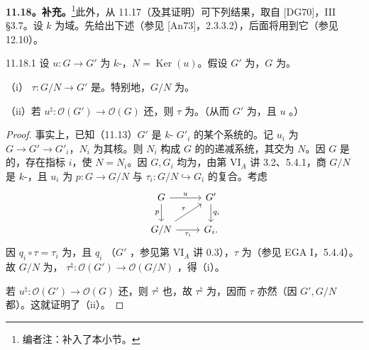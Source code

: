 \textbf{11.18。补充。}\footnote{编者注：补入了本小节。}此外，从 11.17（及其证明）可下列结果，取自 [DG70]，III §3.7。设 $k$ 为域。先给出下述（参见 [An73]，2.3.3.2），后面将用到它（参见 12.10）。

\begin{SGAresult}{}{11.18.1}
设 $u:G\to G'$ 为 $k$-，$N=\operatorname{Ker}(u)$。假设 $G'$ 为，$G$ 为。

（i） $\tau:G/N\to G'$ 是。特别地，$G/N$ 为。

（ii）若 $u^\natural:\mathcal O(G')\to\mathcal O(G)$ 还，则 $\tau$ 为。（从而 $G'$ 为，且 $u$ 。）
\end{SGAresult}
\begin{proof}
事实上，已知（11.13）$G'$ 是 $k$- $G'_i$ 的某个系统的。记 $u_i$ 为 $G\to G'\to G'_i$，$N_i$ 为其核。则 $N_i$ 构成 $G$ 的的递减系统，其交为 $N$。因 $G$ 是的，存在指标 $i$，使 $N=N_i$。因 $G,G_i$ 均为，由第 VI$_A$ 讲 3.2、5.4.1，商 $G/N$ 是 $k$-，且 $u_i$ 为 $p:G\to G/N$ 与 $\tau_i:G/N\hookrightarrow G_i$ 的复合。考虑
\[
\begin{tikzcd}
G\arrow[r,"u"]\arrow[d,"p"']&G'\arrow[d,"q_i"]\\
G/N\arrow[r,"\tau_i"']\arrow[ur,"\tau"]&G_i.
\end{tikzcd}
\]
因 $q_i\circ\tau=\tau_i$ 为，且 $q_i$ （$G'$ ，参见第 VI$_A$ 讲 0.3），$\tau$ 为（参见 EGA I，5.4.4）。故 $G/N$ 为， $\tau^\natural:\mathcal O(G')\to\mathcal O(G/N)$ ，得（i）。

若 $u^\natural:\mathcal O(G')\to\mathcal O(G)$ 还，则 $\tau^\natural$ 也，故 $\tau^\natural$ 为，因而 $\tau$ 亦然（因 $G',G/N$ 都）。这就证明了（ii）。
\end{proof}

